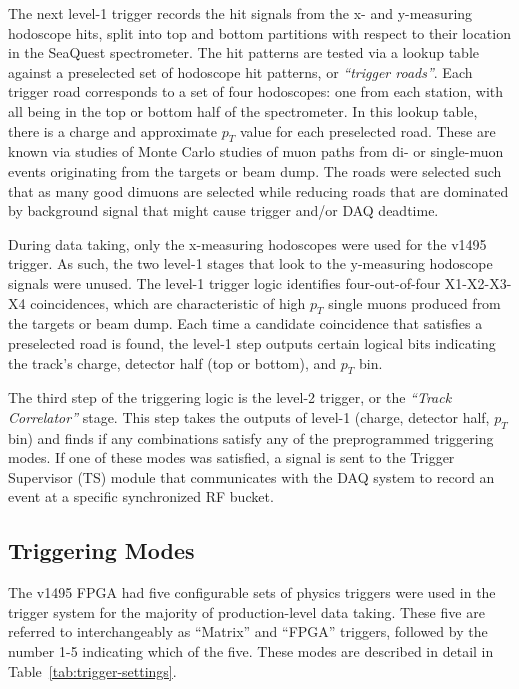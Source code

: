 The next level-1 trigger records the hit signals from the x- and y-measuring hodoscope hits, split into top and bottom partitions with respect to their location in the SeaQuest spectrometer. The hit patterns are tested via a lookup table against a preselected set of hodoscope hit patterns, or \emph{``trigger roads''}. Each trigger road corresponds to a set of four hodoscopes: one from each station, with all being in the top or bottom half of the spectrometer. In this lookup table, there is a charge and approximate $p_T$ value for each preselected road. These are known via studies of Monte Carlo studies of muon paths from di- or single-muon events originating from the targets or beam dump. The roads were selected such that as many good dimuons are selected while reducing roads that are dominated by background signal that might cause trigger and/or DAQ deadtime.

During data taking, only the x-measuring hodoscopes were used for the v1495 trigger. As such, the two level-1 stages that look to the y-measuring hodoscope signals were unused. The level-1 trigger logic identifies four-out-of-four X1-X2-X3-X4 coincidences, which are characteristic of high $p_T$ single muons produced from the targets or beam dump. Each time a candidate coincidence that satisfies a preselected road is found, the level-1 step outputs certain logical bits indicating the track's charge, detector half (top or bottom), and $p_T$ bin.

The third step of the triggering logic is the level-2 trigger, or the \emph{``Track Correlator''} stage. This step takes the outputs of level-1 (charge, detector half, $p_T$ bin) and finds if any combinations satisfy any of the preprogrammed triggering modes. If one of these modes was satisfied, a signal is sent to the Trigger Supervisor (TS) module that communicates with the DAQ system to record an event at a specific synchronized RF bucket.

\subsection{Triggering Modes}

The v1495 FPGA had five configurable sets of physics triggers were used in the trigger system for the majority of production-level data taking. These five are referred to interchangeably as ``Matrix'' and ``FPGA'' triggers, followed by the number 1-5 indicating which of the five. These modes are described in detail in Table~\ref{tab:trigger-settings}.

